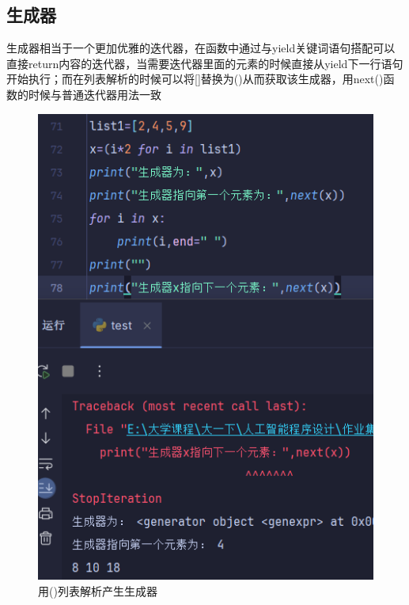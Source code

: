 \documentclass[10pt]{article}
\begin{document}
	\subsection{生成器}
	生成器相当于一个更加优雅的迭代器，在函数中通过与yield关键词语句搭配可以直接return内容的迭代器，当需要迭代器里面的元素的时候直接从yield下一行语句开始执行；而在列表解析的时候可以将[]替换为()从而获取该生成器，用next()函数的时候与普通迭代器用法一致
	\begin{figure}[H]
		\centering
		\includegraphics[scale=0.5]{生成器1}
		\caption{用()列表解析产生生成器}
	\end{figure}
\end{document}
